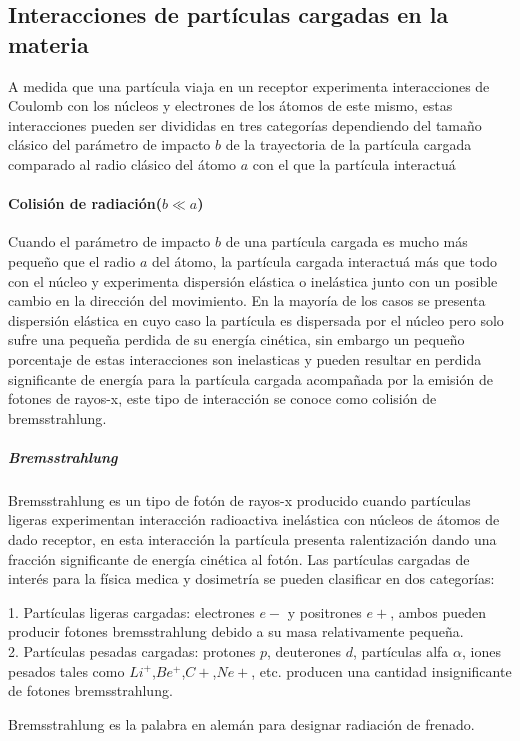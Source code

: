 \subsection{Interacciones de partículas cargadas en la materia}
A medida que una partícula viaja en un receptor experimenta interacciones de Coulomb con los núcleos y electrones de los átomos de este mismo, estas interacciones pueden ser divididas en tres categorías dependiendo del tamaño clásico del parámetro de impacto $b$ de la trayectoria de la partícula cargada comparado al radio clásico del átomo $a$ con el que la partícula interactuá
\paragraph{Colisión de radiación($b\ll a$)}
Cuando el parámetro de impacto $b$ de una partícula cargada es mucho más pequeño que el radio $a$ del átomo, la partícula cargada interactuá más que todo con el núcleo y experimenta dispersión elástica o inelástica junto con un posible cambio en la dirección del movimiento. En la mayoría de los casos se presenta dispersión elástica en cuyo caso la partícula es dispersada por el núcleo pero solo sufre una pequeña perdida de su energía cinética, sin embargo un pequeño porcentaje de estas interacciones son inelasticas y pueden resultar en perdida significante de energía para la partícula cargada acompañada por la emisión de fotones de rayos-x, este tipo de interacción se conoce como colisión de bremsstrahlung\cite{Podgorsak}.


\subparagraph{Bremsstrahlung}
Bremsstrahlung es un tipo de fotón de rayos-x producido cuando partículas ligeras experimentan interacción radioactiva inelástica con núcleos de átomos de dado receptor, en esta interacción la partícula presenta ralentización
 dando una fracción significante de energía cinética al fotón\cite{Frank}. Las partículas cargadas de interés para la física medica y dosimetría se pueden clasificar en dos categorías:

1. Partículas ligeras cargadas: electrones $e-$ y positrones $e+$, ambos pueden producir fotones bremsstrahlung debido a su masa relativamente pequeña\cite{Podgorsak}.\\
2. Partículas pesadas cargadas: protones $p$, deuterones $d$, partículas alfa $\alpha$, iones pesados tales como $Li^+$,$Be^+$,$C+$,$Ne+$, etc. producen una cantidad insignificante de fotones bremsstrahlung\cite{Podgorsak}.

Bremsstrahlung es la palabra en alemán para designar radiación de frenado.

